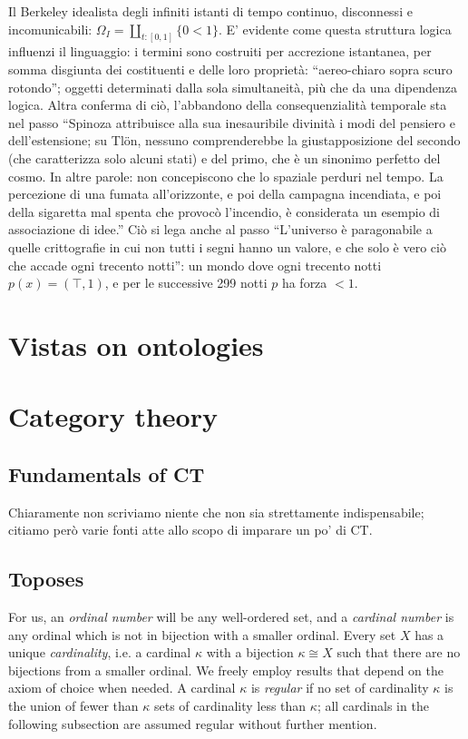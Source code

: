 \documentclass{amsart}
\begin{document}
\begin{example}
  Il Berkeley idealista degli infiniti istanti di tempo continuo, disconnessi e incomunicabili: $\Omega_I = \coprod_{t : [0,1]} \{ 0 < 1 \}$. E' evidente come questa struttura logica influenzi il linguaggio: i termini sono costruiti per accrezione istantanea, per somma disgiunta dei costituenti e delle loro proprietà: ``aereo-chiaro sopra scuro rotondo''; oggetti determinati dalla sola simultaneità, più che da una dipendenza logica. Altra conferma di ciò, l'abbandono della consequenzialità temporale sta nel passo ``Spinoza attribuisce alla sua inesauribile divinità i modi del pensiero e dell'estensione; su Tlön, nessuno comprenderebbe la giustapposizione del  secondo (che caratterizza solo alcuni stati) e del primo, che è un sinonimo  perfetto del cosmo. In altre parole: non concepiscono che lo spaziale perduri  nel tempo. La percezione di una fumata all'orizzonte, e poi della campagna  incendiata, e poi della sigaretta mal spenta che provocò l'incendio, è  considerata un esempio di associazione di idee.'' Ciò si lega anche al passo ``L'universo è paragonabile a quelle crittografie in cui non tutti i segni hanno un valore, e che solo è vero ciò che accade ogni trecento notti'': un mondo dove ogni trecento notti $p(x) =(\top,1)$, e per le successive 299 notti $p$ ha forza $<1$.
\end{example}
\begin{example}
  
\end{example}
\section{Vistas on ontologies}
\appendix
\section{Category theory}
\subsection{Fundamentals of CT}
Chiaramente non scriviamo niente che non sia strettamente indispensabile; citiamo però varie fonti atte allo scopo di imparare un po' di CT.
\subsection{Toposes}\leavevmode
{}
For us, an \emph{ordinal number} will be any well\hyp{}ordered set, and a \emph{cardinal number} is any ordinal which is not in bijection with a smaller ordinal. Every set $X$ has a unique \emph{cardinality}, i.e. a cardinal $\kappa$ with a bijection $\kappa \cong X$ such that there are no bijections from a smaller ordinal. We freely employ results that depend on the axiom of choice when needed. A cardinal $\kappa$ is \emph{regular} if no set of cardinality $\kappa$ is the union of fewer than $\kappa$ sets of cardinality less than $\kappa$; all cardinals in the following subsection are assumed regular without further mention.
\end{document}
